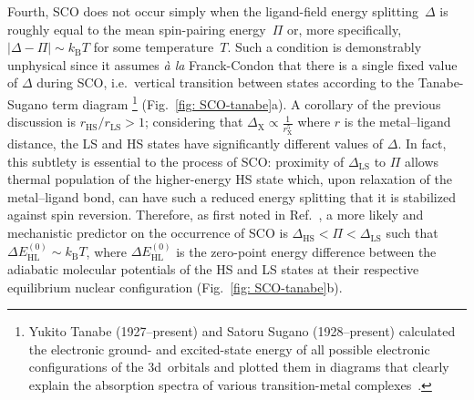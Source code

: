 Fourth, SCO does not occur simply when the ligand-field energy splitting~$\Delta$
is roughly equal to the mean spin-pairing energy~$\Pi$ or,
more specifically, $| \Delta - \Pi | \sim k_\text{B} T$ for some temperature~$T$.
Such a condition is demonstrably unphysical since it assumes \textit{\`{a} la} Franck-Condon
that there is a single fixed value of $\Delta$ during SCO,
i.e.~vertical transition between states according to the Tanabe-Sugano term diagram%
\footnote{Yukito Tanabe (1927--present) and Satoru Sugano (1928--present)
calculated the electronic ground- and excited-state energy of
all possible electronic configurations of the 3d~orbitals
and plotted them in diagrams that clearly explain the absorption spectra of
various transition-metal complexes~\cite{Tanabe1954a, Tanabe1954b, Tanabe1956}.}
(Fig.~\ref{fig: SCO-tanabe}a).
%
A corollary of the previous discussion is $r_\text{HS}/r_\text{LS} > 1$;
considering that $\Delta_\text{X} \propto \frac{1}{r_\text{X}^5}$
where $r$ is the metal--ligand distance,
the LS and HS states have significantly different values of $\Delta$.
%
In fact, this subtlety is essential to the process of SCO:
proximity of $\Delta_\text{LS}$ to $\Pi$ allows thermal population of the higher-energy HS state
which, upon relaxation of the metal--ligand bond, can have such a reduced energy splitting
that it is stabilized against spin reversion.
%
Therefore, as first noted in Ref.~\cite{Ewald1964},
a more likely and mechanistic predictor on the occurrence of SCO
is $\Delta_\text{HS} < \Pi < \Delta_\text{LS}$
such that $\Delta E_\text{HL}^{(0)} \sim k_\text{B}T$,
where $\Delta E_\text{HL}^{(0)}$ is the zero-point energy difference between
the adiabatic molecular potentials of the HS and LS states
at their respective equilibrium nuclear configuration (Fig.~\ref{fig: SCO-tanabe}b).

